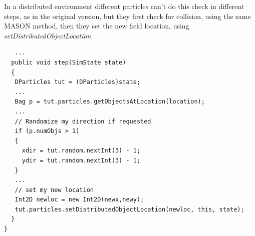 \documentclass[12pt]{article}
\begin{document}
\medskip
In a distributed environment different particles can't do this check in different steps, as in the original version, but they first check for collision, using the same MASON method, then they set the new field location, using \textit{setDistributedObjectLocation}. 
\begin{lstlisting}
   ...
  public void step(SimState state) 
  {
   DParticles tut = (DParticles)state;
   ...
   Bag p = tut.particles.getObjectsAtLocation(location);
   ...
   // Randomize my direction if requested
   if (p.numObjs > 1)
   {
     xdir = tut.random.nextInt(3) - 1;
     ydir = tut.random.nextInt(3) - 1;
   }
   ...
   // set my new location
   Int2D newloc = new Int2D(newx,newy);
   tut.particles.setDistributedObjectLocation(newloc, this, state);	
  }
}
\end{lstlisting}
\medskip
\end{document}
